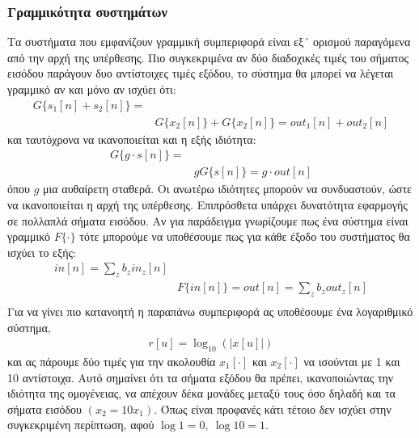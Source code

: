 \documentclass[breaklines=true, 12pt]{article}
\begin{document}
\subsubsection{Γραμμικότητα συστημάτων}
\label{sec:org2373f92}
Τα συστήματα που εμφανίζουν γραμμική συμπεριφορά είναι εξ´ ορισμού
παραγόμενα από την αρχή της υπέρθεσης. Πιο συγκεκριμένα αν δύο διαδοχικές
τιμές του σήματος εισόδου παράγουν δυο αντίστοιχες τιμές εξόδου, το σύστημα
θα μπορεί να λέγεται γραμμικό αν και μόνο αν ισχύει ότι:
\begin{equation}
\begin{align}
G\{s_{1}[n]+s_{2}[n]\} = \\
&G\{x_{2}[n]\}+G\{x_{2}[n]\} = out_{1}[n] + out_{2}[n]
\end{align}
\end{equation}
και ταυτόχρονα να ικανοποιείται και η εξής ιδιότητα:
\begin{equation}
\begin{align}
G\{g \cdot s[n]\} = \\
&gG\{s[n]\} = g\cdot out[n]
\end{align}
\end{equation}
όπου \(g\) μια αυθαίρετη σταθερά. Οι ανωτέρω ιδιότητες μπορούν να συνδυαστούν,
ώστε να ικανοποιείται η αρχή της υπέρθεσης. Επιπρόσθετα υπάρχει δυνατότητα
εφαρμογής σε πολλαπλά σήματα εισόδου. Αν για παράδειγμα γνωρίζουμε πως ένα
σύστημα είναι γραμμικό \(F\{\cdot\}\) τότε μπορούμε να υποθέσουμε πως για κάθε έξοδο
του συστήματος θα ισχύει το εξής:
\begin{equation}
\begin{align}
in[n] = \sum_{z}b_{z}in_{z}[n] \\
&F\{in[n]\} = out[n] = \sum_{z}b_{z}out_{z}[n] \\
\end{align}
\end{equation}
Για να γίνει πιο κατανοητή η παραπάνω συμπεριφορά ας υποθέσουμε ένα λογαριθμικό
σύστημα,
\begin{equation}
\begin{align}
r[u] = \log_{10}(|x[u]|)
\end{align}
\end{equation}
και ας πάρουμε δύο τιμές για την ακολουθία \(x_{1}[\cdot]\) και \(x_{2}[\cdot]\) να ισούνται με 1 και 10
αντίστοιχα. Αυτό σημαίνει ότι τα σήματα εξόδου θα πρέπει, ικανοποιώντας την
ιδιότητα της ομογένειας, να απέχουν δέκα μονάδες μεταξύ τους όσο δηλαδή και
τα σήματα εισόδου \((x_{2}=10x_{1})\). Όπως είναι προφανές κάτι τέτοιο δεν ισχύει
στην συγκεκριμένη περίπτωση, αφού \(\log1=0,\ \log10=1\).
\end{document}
